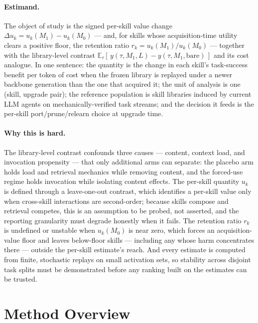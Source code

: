 \documentclass[11pt]{article}
\begin{document}
\paragraph{Estimand.}
The object of study is the signed per-skill value change $\Delta u_k = u_k(M_1) - u_k(M_0)$ --- and, for skills whose acquisition-time utility clears a positive floor, the retention ratio $r_k = u_k(M_1) / u_k(M_0)$ --- together with the library-level contrast $\mathbb{E}_{\tau}[\, y(\tau, M_1, L) - y(\tau, M_1, \mathrm{bare}) \,]$ and its cost analogue. In one sentence: the quantity is the change in each skill's task-success benefit per token of cost when the frozen library is replayed under a newer backbone generation than the one that acquired it; the unit of analysis is one (skill, upgrade pair); the reference population is skill libraries induced by current LLM agents on mechanically-verified task streams; and the decision it feeds is the per-skill port/prune/relearn choice at upgrade time.

\paragraph{Why this is hard.}
The library-level contrast confounds three causes --- content, context load, and invocation propensity --- that only additional arms can separate: the placebo arm holds load and retrieval mechanics while removing content, and the forced-use regime holds invocation while isolating content effects. The per-skill quantity $u_k$ is defined through a leave-one-out contrast, which identifies a per-skill value only when cross-skill interactions are second-order; because skills compose and retrieval competes, this is an assumption to be probed, not asserted, and the reporting granularity must degrade honestly when it fails. The retention ratio $r_k$ is undefined or unstable when $u_k(M_0)$ is near zero, which forces an acquisition-value floor and leaves below-floor skills --- including any whose harm concentrates there --- outside the per-skill estimate's reach. And every estimate is computed from finite, stochastic replays on small activation sets, so stability across disjoint task splits must be demonstrated before any ranking built on the estimates can be trusted.

\section{Method Overview}
\end{document}
